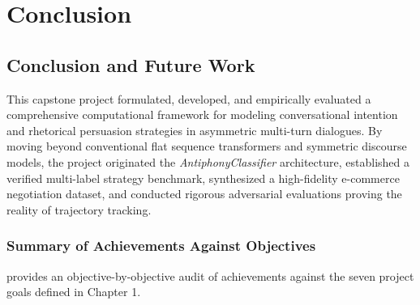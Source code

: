 \chapter{Conclusion}
\label{ch:conclusion}

\section{Conclusion and Future Work}
\label{sec:conclusion}

This capstone project formulated, developed, and empirically evaluated a comprehensive computational framework for modeling conversational intention and rhetorical persuasion strategies in asymmetric multi-turn dialogues. By moving beyond conventional flat sequence transformers and symmetric discourse models, the project originated the \textit{AntiphonyClassifier} architecture, established a verified multi-label strategy benchmark, synthesized a high-fidelity e-commerce negotiation dataset, and conducted rigorous adversarial evaluations proving the reality of trajectory tracking.

\subsection{Summary of Achievements Against Objectives}
 provides an objective-by-objective audit of achievements against the seven project goals defined in Chapter 1.

